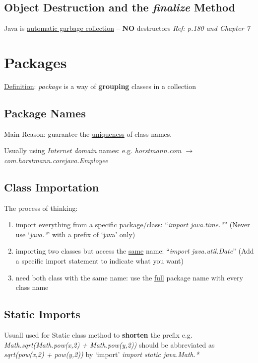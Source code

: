 \documentclass[12pt]{article}
\begin{document}
\subsection{Object Destruction and the \emph{finalize} Method}
Java is \underline{automatic garbage collection} -- \textbf{NO} destructors\newline
\textit{Ref: p.180 and Chapter 7}

\section{Packages}
\underline{Definition}: \textit{package} is a way of \textbf{grouping} classes in a collection
\subsection{Package Names}
Main Reason: guarantee the \underline{uniqueness} of class names.

Usually using \emph{Internet domain} names:\newline
e.g. \textit{horstmann.com $\rightarrow$ com.horstmann.corejava.Employee}

\subsection{Class Importation}
The process of thinking:
\begin{enumerate}
    \item import everything from a specific package/class: ``\emph{import java.time.*}''\newline
    (Never use `\emph{java.*}' with a prefix of `java' only)
    \item importing two classes but access the \underline{same} name: ``\emph{import java.util.Date}''\newline
    (Add a specific import statement to indicate what you want)
    \item need both class with the same name: use the \underline{full} package name with every class name
\end{enumerate}

\subsection{Static Imports}
Usuall used for Static class method to \textbf{shorten} the prefix\newline
e.g. \newline
\emph{Math.sqrt(Math.pow(x,2) + Math.pow(y,2))} should be abbreviated as\newline
\emph{sqrt(pow(x,2) + pow(y,2))} by `import'\newline
\emph{import static java.Math.*}
\end{document}

